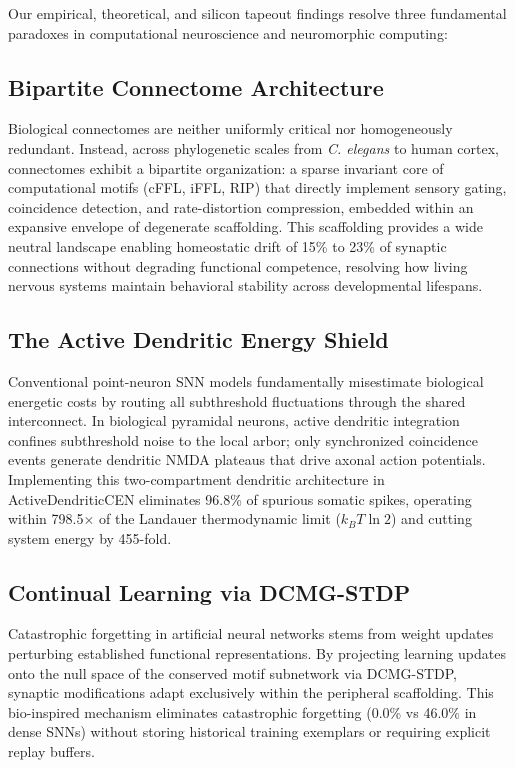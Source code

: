 \documentclass[10pt,twocolumn,letterpaper]{article}
\begin{document}
Our empirical, theoretical, and silicon tapeout findings resolve three fundamental paradoxes in computational neuroscience and neuromorphic computing:

\subsection{Bipartite Connectome Architecture}
Biological connectomes are neither uniformly critical nor homogeneously redundant. Instead, across phylogenetic scales from \textit{C. elegans} to human cortex, connectomes exhibit a bipartite organization: a sparse invariant core of computational motifs (cFFL, iFFL, RIP) that directly implement sensory gating, coincidence detection, and rate-distortion compression, embedded within an expansive envelope of degenerate scaffolding. This scaffolding provides a wide neutral landscape enabling homeostatic drift of 15\% to 23\% of synaptic connections without degrading functional competence, resolving how living nervous systems maintain behavioral stability across developmental lifespans.

\subsection{The Active Dendritic Energy Shield}
Conventional point-neuron SNN models fundamentally misestimate biological energetic costs by routing all subthreshold fluctuations through the shared interconnect. In biological pyramidal neurons, active dendritic integration confines subthreshold noise to the local arbor; only synchronized coincidence events generate dendritic NMDA plateaus that drive axonal action potentials. Implementing this two-compartment dendritic architecture in ActiveDendriticCEN eliminates 96.8\% of spurious somatic spikes, operating within 798.5$\times$ of the Landauer thermodynamic limit ($k_B T \ln 2$) and cutting system energy by 455-fold.

\subsection{Continual Learning via DCMG-STDP}
Catastrophic forgetting in artificial neural networks stems from weight updates perturbing established functional representations. By projecting learning updates onto the null space of the conserved motif subnetwork via DCMG-STDP, synaptic modifications adapt exclusively within the peripheral scaffolding. This bio-inspired mechanism eliminates catastrophic forgetting (0.0\% vs 46.0\% in dense SNNs) without storing historical training exemplars or requiring explicit replay buffers.
\end{document}
